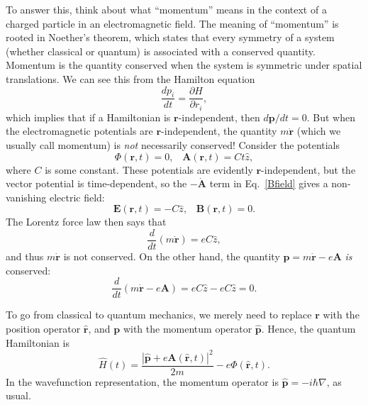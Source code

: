 \documentclass[pra,12pt]{revtex4}
\begin{document}
To answer this, think about what ``momentum'' means in the context of
a charged particle in an electromagnetic field.  The meaning of
``momentum'' is rooted in Noether's theorem, which states that every
symmetry of a system (whether classical or quantum) is associated with
a conserved quantity.  Momentum is the quantity conserved when the
system is symmetric under spatial translations.  We can see this from
the Hamilton equation
\begin{equation*}
  \frac{dp_i}{dt} = \frac{\partial H}{\partial r_i},
\end{equation*}
which implies that if a Hamiltonian is $\mathbf{r}$-independent, then
$d\mathbf{p}/dt = 0$.  But when the electromagnetic potentials are
$\mathbf{r}$-independent, the quantity $m\dot{\mathbf{r}}$ (which we
usually call momentum) is \textit{not} necessarily conserved!
Consider the potentials
\begin{equation}
  \Phi(\mathbf{r}, t) = 0, \;\;\; \mathbf{A}(\mathbf{r}, t) = Ct \hat{z},
\end{equation}
where $C$ is some constant.  These potentials are evidently
$\mathbf{r}$-independent, but the vector potential is time-dependent,
so the $-\dot{\mathbf{A}}$ term in Eq.~\eqref{Bfield} gives a
non-vanishing electric field:
\begin{equation}
  \mathbf{E}(\mathbf{r},t) = - C\hat{z}, \;\;\;\mathbf{B}(\mathbf{r},t) = 0.
\end{equation}
The Lorentz force law then says that
\begin{equation}
  \frac{d}{dt}(m\dot{\mathbf{r}}) = eC\hat{z},
\end{equation}
and thus $m\dot{\mathbf{r}}$ is not conserved.  On the other hand, the
quantity $\mathbf{p} = m\dot{\mathbf{r}} - e \mathbf{A}$ \textit{is}
conserved:
\begin{equation}
  \frac{d}{dt}(m\dot{\mathbf{r}} - e\mathbf{A}) =
  eC\hat{z} - eC\hat{z} = 0.
\end{equation}

To go from classical to quantum mechanics, we merely need to replace
$\mathbf{r}$ with the position operator $\hat{\mathbf{r}}$, and
$\mathbf{p}$ with the momentum operator $\hat{\mathbf{p}}$.  Hence,
the quantum Hamiltonian is
\begin{equation}
\boxed{\qquad
  \hat{H}(t) = \frac{|\hat{\mathbf{p}}+e\mathbf{A}(\hat{\mathbf{r}},t)|^2}{2m}
  - e\Phi(\hat{\mathbf{r}},t).\qquad}
  \label{quantumH}
\end{equation}
In the wavefunction representation, the momentum operator is
$\hat{\mathbf{p}} = -i\hbar\nabla$, as usual.
\end{document}

